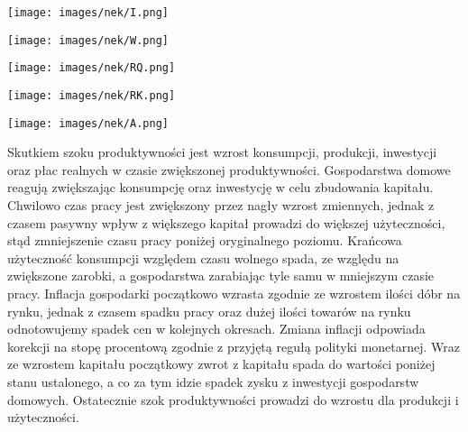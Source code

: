 \begin{center}
    \begin{minipage}{.3\textwidth}
      \centering
      \captionsetup{type=figure}
      \texttt{[image: images/nek/I.png]}
      \label{fig:nek:I}
    \end{minipage}%
    \begin{minipage}{.3\textwidth}
      \centering
      \captionsetup{type=figure}
      \texttt{[image: images/nek/W.png]}
      \label{fig:nek:W}
    \end{minipage}
    \begin{minipage}{.3\textwidth}
      \centering
      \captionsetup{type=figure}
      \texttt{[image: images/nek/RQ.png]}
      \label{fig:nek:RQ}
    \end{minipage}
\end{center}

\begin{center}
    \begin{minipage}{.4\textwidth}
      \centering
      \captionsetup{type=figure}
      \texttt{[image: images/nek/RK.png]}
      \label{fig:nek:RK}
    \end{minipage}%
    \begin{minipage}{.4\textwidth}
      \centering
      \captionsetup{type=figure}
      \texttt{[image: images/nek/A.png]}
      \label{fig:nek:A}
    \end{minipage}
\end{center}

Skutkiem szoku produktywności jest wzrost konsumpcji, produkcji, inwestycji oraz płac realnych w czasie zwiększonej produktywności. Gospodarstwa domowe reagują zwiększając konsumpcję oraz inwestycję w celu zbudowania kapitału. Chwilowo czas pracy jest zwiększony przez nagły wzrost zmiennych, jednak z czasem pasywny wpływ z większego kapitał prowadzi do większej użyteczności, stąd zmniejszenie czasu pracy poniżej oryginalnego poziomu. Krańcowa użyteczność konsumpcji względem czasu wolnego spada, ze względu na zwiększone zarobki, a gospodarstwa zarabiając tyle samu w mniejszym czasie pracy. Inflacja gospodarki początkowo wzrasta zgodnie ze wzrostem ilości dóbr na rynku, jednak z czasem spadku pracy oraz dużej ilości towarów na rynku odnotowujemy spadek cen w kolejnych okresach. Zmiana inflacji odpowiada korekcji na stopę procentową zgodnie z przyjętą regułą polityki monetarnej. Wraz ze wzrostem kapitału początkowy zwrot z kapitału spada do wartości poniżej stanu ustalonego, a co za tym idzie spadek zysku z inwestycji gospodarstw domowych. Ostatecznie szok produktywności prowadzi do wzrostu dla produkcji i użyteczności.

